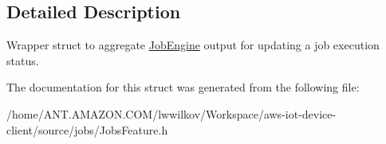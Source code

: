 \subsection{Detailed Description}
Wrapper struct to aggregate \hyperlink{class_aws_1_1_iot_1_1_device_client_1_1_jobs_1_1_job_engine}{Job\+Engine} output for updating a job execution status. 

The documentation for this struct was generated from the following file\+:\begin{DoxyCompactItemize}
\item 
/home/\+A\+N\+T.\+A\+M\+A\+Z\+O\+N.\+C\+O\+M/lwwilkov/\+Workspace/aws-\/iot-\/device-\/client/source/jobs/Jobs\+Feature.\+h\end{DoxyCompactItemize}
